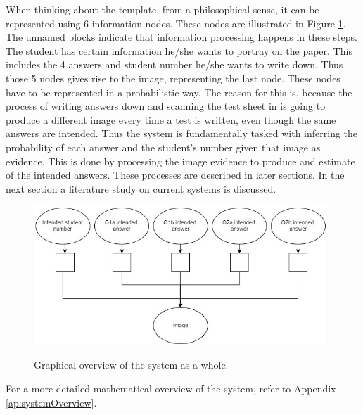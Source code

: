 When thinking about the template, from a philosophical sense, it can be represented using 6 information nodes. These nodes are illustrated in Figure \ref{fig:systemOverviewIntro}. The unnamed blocks indicate that information processing happens in these steps. The student has certain information he/she wants to portray on the paper. This includes the 4 answers and student number he/she wants to write down. Thus those 5 nodes gives rise to the image, representing the last node. These nodes have to be represented in a probabilistic way. The reason for this is, because the process of writing answers down and scanning the test sheet in is going to produce a different image every time a test is written, even though the same answers are intended. Thus the system is fundamentally tasked with inferring the probability of each answer and the student's number given that image as evidence. This is done by processing the image evidence to produce and estimate of the intended answers. These processes are described in later sections. In the next section a literature study on current systems is discussed.
\begin{figure}
  \centering
  \includegraphics[width=11cm]{systemOverview}\\
  \caption{Graphical overview of the system as a whole.}
  \label{fig:systemOverviewIntro}
\end{figure}

For a more detailed mathematical overview of the system, refer to Appendix \ref{ap:systemOverview}.



